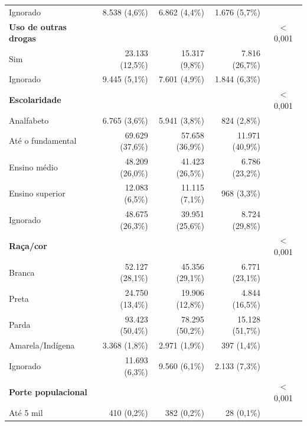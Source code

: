 \begin{longtable}{@{}l@{\extracolsep{\fill}}rrrc@{}}
        \hspace{3mm}Ignorado & 8.538 (4,6\%) & 6.862 (4,4\%) & 1.676 (5,7\%) &  \\
        \textbf{Uso de outras drogas} &  &  &  & $<$ 0,001 \\
        \hspace{3mm}Sim & 23.133 (12,5\%) & 15.317 (9,8\%) & 7.816 (26,7\%) &  \\
        \hspace{3mm}Ignorado & 9.445 (5,1\%) & 7.601 (4,9\%) & 1.844 (6,3\%) &  \\
        \textbf{Escolaridade} &  &  &  & $<$ 0,001 \\
        \hspace{3mm}Analfabeto & 6.765 (3,6\%) & 5.941 (3,8\%) & 824 (2,8\%) &  \\
        \hspace{3mm}Até o fundamental & 69.629 (37,6\%) & 57.658 (36,9\%) & 11.971 (40,9\%) &  \\
        \hspace{3mm}Ensino médio & 48.209 (26,0\%) & 41.423 (26,5\%) & 6.786 (23,2\%) &  \\
        \hspace{3mm}Ensino superior & 12.083 (6,5\%) & 11.115 (7,1\%) & 968 (3,3\%) &  \\
        \hspace{3mm}Ignorado & 48.675 (26,3\%) & 39.951 (25,6\%) & 8.724 (29,8\%) &  \\
        \textbf{Raça/cor} &  &  &  & $<$ 0,001 \\
        \hspace{3mm}Branca & 52.127 (28,1\%) & 45.356 (29,1\%) & 6.771 (23,1\%) &  \\
        \hspace{3mm}Preta & 24.750 (13,4\%) & 19.906 (12,8\%) & 4.844 (16,5\%) &  \\
        \hspace{3mm}Parda & 93.423 (50,4\%) & 78.295 (50,2\%) & 15.128 (51,7\%) &  \\
        \hspace{3mm}Amarela/Indígena & 3.368 (1,8\%) & 2.971 (1,9\%) & 397 (1,4\%) &  \\
        \hspace{3mm}Ignorado & 11.693 (6,3\%) & 9.560 (6,1\%) & 2.133 (7,3\%) &  \\
        \textbf{Porte populacional} &  &  &  & $<$ 0,001 \\
        \hspace{3mm}Até 5 mil & 410 (0,2\%) & 382 (0,2\%) & 28 (0,1\%) &  \\

\end{longtable}
